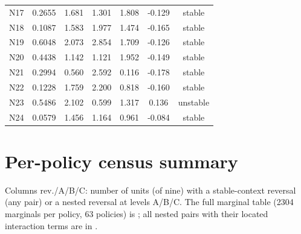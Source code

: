\documentclass[10pt,a4paper]{article}
\begin{document}
{\begin{longtable}{lcccccc}
N17 & 0.2655 & 1.681 & 1.301 & 1.808 & -0.129 & stable \\
N18 & 0.1087 & 1.583 & 1.977 & 1.474 & -0.165 & stable \\
N19 & 0.6048 & 2.073 & 2.854 & 1.709 & -0.126 & stable \\
N20 & 0.4438 & 1.142 & 1.121 & 1.952 & -0.149 & stable \\
N21 & 0.2994 & 0.560 & 2.592 & 0.116 & -0.178 & stable \\
N22 & 0.1228 & 1.759 & 2.200 & 0.818 & -0.160 & stable \\
N23 & 0.5486 & 2.102 & 0.599 & 1.317 & 0.136 & unstable \\
N24 & 0.0579 & 1.456 & 1.164 & 0.961 & -0.084 & stable \\
\bottomrule
\end{longtable}}


\section{Per-policy census summary}
Columns rev./A/B/C: number of units (of nine) with a stable-context reversal (any pair) or a nested reversal at levels A/B/C. The full marginal table (2304 marginals per policy, 63 policies) is ; all nested pairs with their located interaction terms are in .
\end{document}
